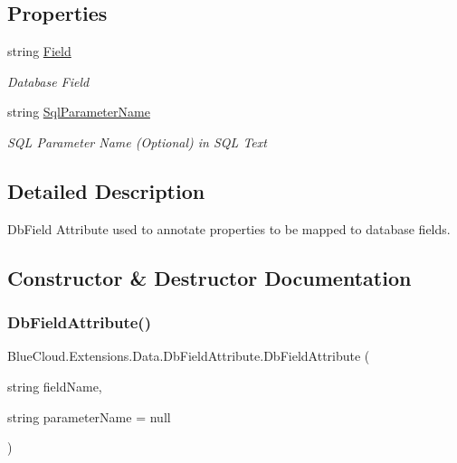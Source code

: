 \subsection*{Properties}
\begin{DoxyCompactItemize}
\item 
string \mbox{\hyperlink{class_blue_cloud_1_1_extensions_1_1_data_1_1_db_field_attribute_a146fcf50500222d224a12e27dd4c2285}{Field}}
\begin{DoxyCompactList}\small\item\em Database Field \end{DoxyCompactList}\item 
string \mbox{\hyperlink{class_blue_cloud_1_1_extensions_1_1_data_1_1_db_field_attribute_a87545da9d89ae282b3ade4616b960938}{Sql\+Parameter\+Name}}
\begin{DoxyCompactList}\small\item\em S\+QL Parameter Name (Optional) in S\+QL Text \end{DoxyCompactList}\end{DoxyCompactItemize}


\subsection{Detailed Description}
Db\+Field Attribute used to annotate properties to be mapped to database fields. 



\subsection{Constructor \& Destructor Documentation}
\mbox{\label{class_blue_cloud_1_1_extensions_1_1_data_1_1_db_field_attribute_a215a03bd00877393b57b061cbf6fdc85}} 
\subsubsection{\texorpdfstring{Db\+Field\+Attribute()}{DbFieldAttribute()}}
{\footnotesize\ttfamily Blue\+Cloud.\+Extensions.\+Data.\+Db\+Field\+Attribute.\+Db\+Field\+Attribute (\begin{DoxyParamCaption}\item[{string}]{field\+Name,  }\item[{string}]{parameter\+Name = {\ttfamily null} }\end{DoxyParamCaption})\hspace{0.3cm}{\ttfamily [inline]}}



